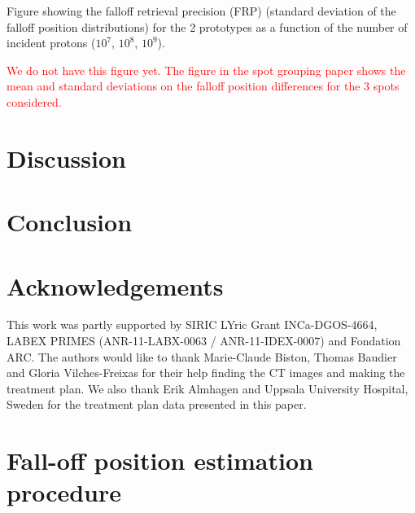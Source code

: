 \documentclass[a4paper,english]{article}
\begin{document}
Figure showing the falloff retrieval precision (FRP) (standard deviation of the falloff position distributions) for the 2 prototypes as a function of the number of incident protons ($10^7$, $10^8$, $10^9$).

\textcolor{red}{We do not have this figure yet. The figure in the spot grouping paper shows the mean and standard deviations on the falloff position differences for the 3 spots considered.}

\section{Discussion}


\section{Conclusion}


\section{Acknowledgements}

This work was partly supported by SIRIC LYric Grant INCa-DGOS-4664, LABEX PRIMES (ANR-11-LABX-0063 / ANR-11-IDEX-0007) and Fondation ARC. The authors would like to thank Marie-Claude Biston, Thomas Baudier and Gloria Vilches-Freixas for their help finding the CT images and making the treatment plan. We also thank Erik Almhagen and Uppsala University Hospital, Sweden for the treatment plan data presented in this paper.

\newpage

\appendix
% 

\section{Fall-off position estimation procedure}\label{sec:fopproc}
\end{document}
